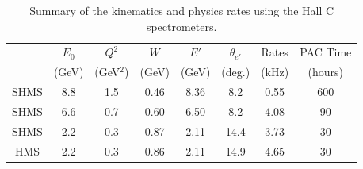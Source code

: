 
\begin{table}
\begin{center}
\begin{tabular}{c|c|c|c|c|c|c|c}
& $E_0$ & $Q^2$    &  $W$  	& $E'$  &    $\theta_{e'}$  &  Rates   & PAC Time   \\
& (GeV) & (GeV$^2$)  			& (GeV) 			& (GeV)  &     (deg.)   &   (kHz)  & (hours) \\
\hline\hline
SHMS & 8.8	&  1.5	&  0.46	&  8.36	&    8.2 	&    0.55	&   600 \\
SHMS & 6.6	&  0.7	&  0.60	&  6.50	&    8.2 	&    4.08	&   90 \\
SHMS & 2.2	&  0.3	&  0.87	&  2.11	&    14.4 	&    3.73	&   30 \\
HMS  & 2.2	&  0.3	&  0.86	&  2.11	&    14.9	&    4.65	&   30 \\  

\hline\hline
\end{tabular}
\caption{\label{RATES1}Summary of the kinematics and physics rates using the Hall C  spectrometers.}
\end{center}
\end{table}


